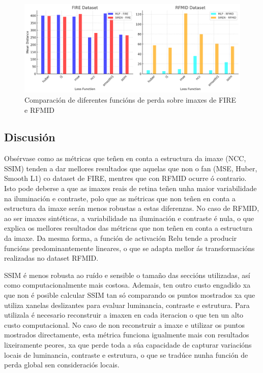 \begin{figure}[ht]
    \centering
    \includegraphics[width=1\textwidth]{imaxes/losstype.png}
    \caption{Comparación de diferentes funcións de perda sobre imaxes de FIRE e RFMID}
    \label{fig:loss_functions_comparison}
\end{figure}

\subsection{Discusión}
\label{subsec:Discusion-loss}

Obsérvase como as métricas que teñen en conta a estructura da imaxe (NCC, SSIM) tenden a dar mellores resultados que aquelas que non o fan (MSE, Huber, Smooth L1) co dataset de FIRE, mentres que con RFMID ocurre ó contrario.
Isto pode deberse a que as imaxes reais de retina teñen unha maior variabilidade na iluminación e contraste, polo que as métricas que non teñen en conta a estructura da imaxe serán menos robustas a estas diferenzas.
No caso de RFMID, ao ser imaxes sintéticas, a variabilidade na iluminación e contraste é nula, o que explica os mellores resultados das métricas que non teñen en conta a estructura da imaxe.
Da mesma forma, a función de activación Relu tende a producir funcións predominantemente lineares, o que se adapta mellor ás transformacións realizadas no dataset RFMID.

SSIM é menos robusta ao ruído e sensible o tamaño das seccións utilizadas, así como computacionalmente mais costosa. Ademais, ten outro custo engadido xa que non é posible calcular SSIM tan só comparando os puntos mostrados xa que utiliza xanelas deslizantes para evaluar luminancia, contraste e estrutura. 
Para utilizala é necesario reconstruir a imaxen en cada iteracion o que ten un alto custo computacional.
No caso de non reconstruir a imaxe e utilizar os puntos mostrados directamente, esta métrica funciona igualmente mais con resultados lixeiramente peores, xa que perde toda a súa capacidade de capturar variacións locais de luminancia, contraste e estrutura, o que se tradúce nunha función de perda global sen consideraciós locais.


